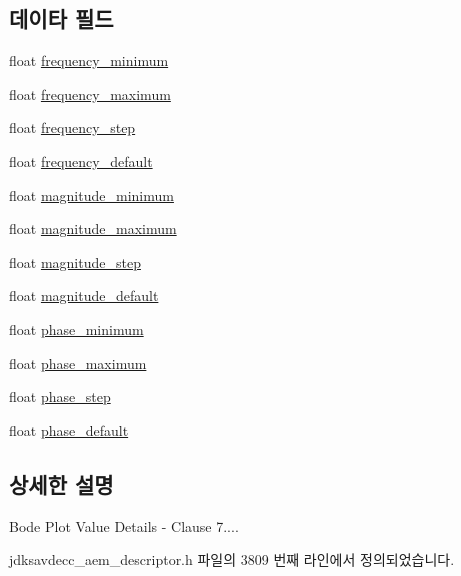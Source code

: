 \subsection*{데이타 필드}
\begin{DoxyCompactItemize}
\item 
float \hyperlink{structjdksavdecc__values__bode__plot_ac2f4b33e27fd68491ba8c615184f45b1}{frequency\+\_\+minimum}
\item 
float \hyperlink{structjdksavdecc__values__bode__plot_a9a9464d23652680945738ee57530d4c9}{frequency\+\_\+maximum}
\item 
float \hyperlink{structjdksavdecc__values__bode__plot_ac6660c43196c54a294ec3f38667a2c54}{frequency\+\_\+step}
\item 
float \hyperlink{structjdksavdecc__values__bode__plot_acf954095c1b3ebf63d5aee12a9193b77}{frequency\+\_\+default}
\item 
float \hyperlink{structjdksavdecc__values__bode__plot_ad49b5753eec6d1f52031437ff3aebd32}{magnitude\+\_\+minimum}
\item 
float \hyperlink{structjdksavdecc__values__bode__plot_ad232dbbda4bd135bc57d846cfe82c60f}{magnitude\+\_\+maximum}
\item 
float \hyperlink{structjdksavdecc__values__bode__plot_a1ce8f90a7972ff2257328d8616e98e51}{magnitude\+\_\+step}
\item 
float \hyperlink{structjdksavdecc__values__bode__plot_afaf35eb351724eb0b20277d519ed7d38}{magnitude\+\_\+default}
\item 
float \hyperlink{structjdksavdecc__values__bode__plot_a8e404eb68fb24ec7bc16daaf6f826c3a}{phase\+\_\+minimum}
\item 
float \hyperlink{structjdksavdecc__values__bode__plot_a5dfca76f4af2509da81aa5658afae11c}{phase\+\_\+maximum}
\item 
float \hyperlink{structjdksavdecc__values__bode__plot_af6b595fa87a001625f4cd8f0c5a4611c}{phase\+\_\+step}
\item 
float \hyperlink{structjdksavdecc__values__bode__plot_acbb532133ed4fca28d4d904470007758}{phase\+\_\+default}
\end{DoxyCompactItemize}


\subsection{상세한 설명}
Bode Plot Value Details -\/ Clause 7.... 

jdksavdecc\+\_\+aem\+\_\+descriptor.\+h 파일의 3809 번째 라인에서 정의되었습니다.



